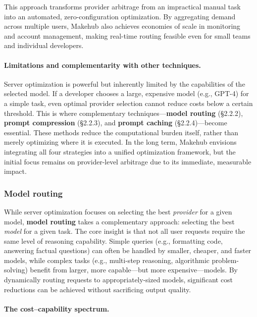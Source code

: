 \documentclass[english]{article}
\begin{document}
This approach transforms provider arbitrage from an impractical manual task into an automated, zero-configuration optimization. By aggregating demand across multiple users, Makehub also achieves economies of scale in monitoring and account management, making real-time routing feasible even for small teams and individual developers.

\paragraph{Limitations and complementarity with other techniques.}

Server optimization is powerful but inherently limited by the capabilities of the selected model. If a developer chooses a large, expensive model (e.g., GPT-4) for a simple task, even optimal provider selection cannot reduce costs below a certain threshold. This is where complementary techniques—\textbf{model routing} (§2.2.2), \textbf{prompt compression} (§2.2.3), and \textbf{prompt caching} (§2.2.4)—become essential. These methods reduce the computational burden itself, rather than merely optimizing where it is executed. In the long term, Makehub envisions integrating all four strategies into a unified optimization framework, but the initial focus remains on provider-level arbitrage due to its immediate, measurable impact.


\subsubsection{Model routing}

While server optimization focuses on selecting the best \emph{provider} for a given model, \textbf{model routing} takes a complementary approach: selecting the best \emph{model} for a given task. The core insight is that not all user requests require the same level of reasoning capability. Simple queries (e.g., formatting code, answering factual questions) can often be handled by smaller, cheaper, and faster models, while complex tasks (e.g., multi-step reasoning, algorithmic problem-solving) benefit from larger, more capable—but more expensive—models. By dynamically routing requests to appropriately-sized models, significant cost reductions can be achieved without sacrificing output quality.

\paragraph{The cost–capability spectrum.}
\end{document}
